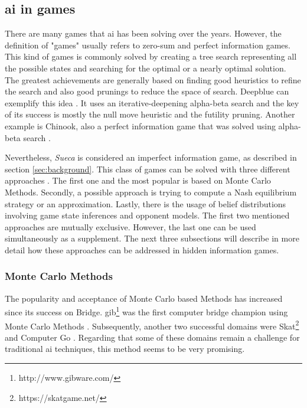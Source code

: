\subsection{\gls{ai} in games}
 
There are many games that \gls{ai} has been solving over the years.
However, the definition of "games" usually refers to zero-sum and perfect information games.
This kind of games is commonly solved by creating a tree search representing all the possible states and searching for the optimal or a nearly optimal solution.
The greatest achievements are generally based on finding good heuristics to refine the search and also good prunings to reduce the space of search.
Deepblue can exemplify this idea \cite{Campbell2002}.
It uses an iterative-deepening alpha-beta search and the key of its success is mostly the null move heuristic and the futility pruning.
Another example is Chinook, also a perfect information game that was solved using alpha-beta search \cite{Schaeffer1996}.

Nevertheless, \emph{Sueca} is considered an imperfect information game, as described in section \ref{sec:background}.
This class of games can be solved with three different approaches \cite{Cowling2012}.
The first one and the most popular is based on Monte Carlo Methods.
Secondly, a possible approach is trying to compute a Nash equilibrium strategy or an approximation.
Lastly, there is the usage of belief distributions involving game state inferences and opponent models.
The first two mentioned approaches are mutually exclusive.
However, the last one can be used simultaneously as a supplement.
The next three subsections will describe in more detail how these approaches can be addressed in hidden information games.





\subsubsection{Monte Carlo Methods}

The popularity and acceptance of Monte Carlo based Methods has increased since its success on Bridge.
\gls{gib}\footnote{http://www.gibware.com/} was the first computer bridge champion using Monte Carlo Methods \cite{Ginsberg2001}.
Subsequently, another two successful domains were Skat\footnote{https://skatgame.net/} and Computer Go \cite{Gelly2011}.
Regarding that some of these domains remain a challenge for traditional \gls{ai} techniques, this method seems to be very promising.



